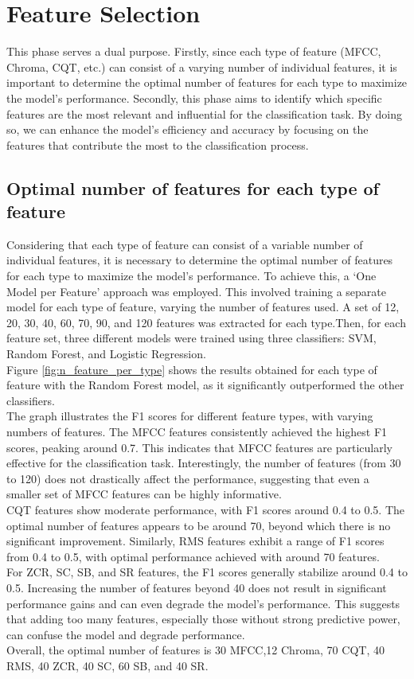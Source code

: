 \section{Feature Selection}
This phase serves a dual purpose. Firstly, since each type of feature (MFCC, Chroma, CQT, etc.) can consist of a varying number of individual features,
it is important to determine the optimal number of features for each type to maximize the model's performance.
Secondly, this phase aims to identify which specific features are the most relevant and influential for the classification task.
By doing so, we can enhance the model's efficiency and accuracy by focusing on the features that contribute the most to the classification process.

\subsection{Optimal number of features for each type of feature}
Considering that each type of feature can consist of a variable number of individual features,
it is necessary to determine the optimal number of features for each type to maximize the model's performance.
To achieve this, a `One Model per Feature' approach was employed. This involved training a separate model for each type of feature,
varying the number of features used. A set of 12, 20, 30, 40, 60, 70, 90, and 120 features was extracted for each type.Then, for each feature set,
three different models were trained using three classifiers: SVM, Random Forest, and Logistic Regression.\\
Figure \ref{fig:n_feature_per_type} shows the results obtained for each type of feature with the Random Forest model,
as it significantly outperformed the other classifiers.\\
The graph illustrates the F1 scores for different feature types, with varying numbers of features.
The MFCC features consistently achieved the highest F1 scores, peaking around 0.7.
This indicates that MFCC features are particularly effective for the classification task.
Interestingly, the number of features (from 30 to 120) does not drastically affect the performance, suggesting that even a smaller set of MFCC
features can be highly informative.\\
CQT features show moderate performance, with F1 scores around 0.4 to 0.5. The optimal number of features appears to be around 70,
beyond which there is no significant improvement. Similarly, RMS features exhibit a range of F1 scores from 0.4 to 0.5,
with optimal performance achieved with around 70 features.\\
For ZCR, SC, SB, and SR features, the F1 scores generally stabilize around 0.4 to 0.5.
Increasing the number of features beyond 40 does not result in significant performance gains and can even degrade the model's performance.
This suggests that adding too many features, especially those without strong predictive power, can confuse the model and degrade performance.\\
Overall, the optimal number of features is 30 MFCC,12 Chroma, 70 CQT, 40 RMS, 40 ZCR, 40 SC, 60 SB, and 40 SR.

